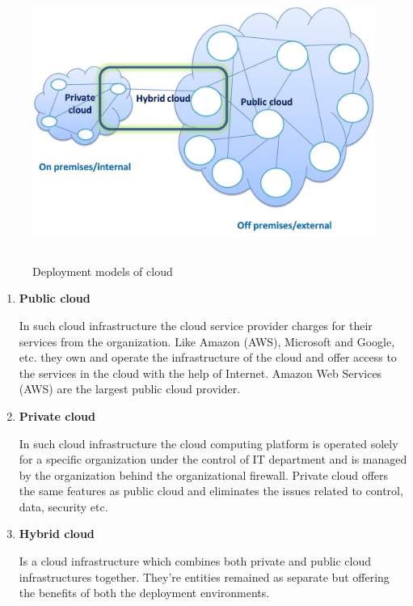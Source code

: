     \begin{figure}[h]
        \centering
        \includegraphics[width=13cm,height=9cm]{images/types_of_cloud.png}
        \caption{Deployment models of cloud}
    \end{figure}
    
    \par
    \begin{enumerate}
    
    \item \textbf{Public cloud}  
    \par
    In such cloud infrastructure the cloud service provider charges for their services from the organization. Like Amazon (AWS), Microsoft and Google, etc. they own and operate the infrastructure of the cloud and offer access to the services in the cloud with the help of Internet. Amazon Web Services (AWS) are the largest public cloud provider\cite{deploy}.
    
    \item \textbf{Private cloud}
    \par
    In such cloud infrastructure the cloud computing platform is operated solely for a specific organization under the control of IT department and is managed by the organization behind the organizational firewall. Private cloud offers the same features as public cloud and eliminates the issues related to control, data, security etc\cite{deploy}.
    
    \item \textbf{Hybrid cloud}
    \par
    Is a cloud infrastructure which combines both private and public cloud infrastructures together. They're entities remained as separate but offering the benefits of both the deployment environments\cite{deploy}.
    \end{enumerate}
    \clearpage
